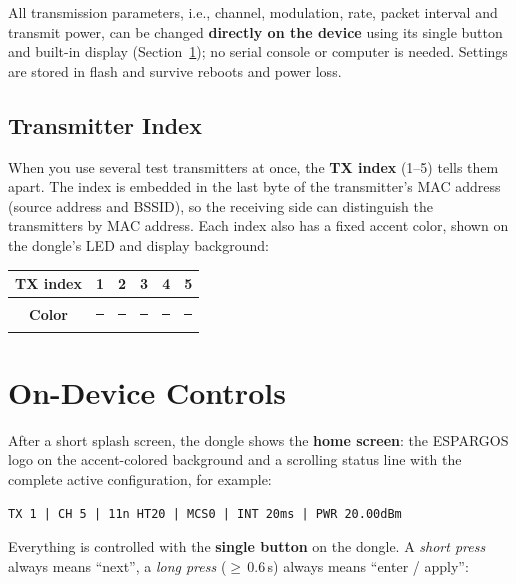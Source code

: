 \documentclass[a5paper, 10pt, twoside]{article}
\begin{document}
All transmission parameters, i.e., channel, modulation, rate, packet interval
and transmit power, can be changed \textbf{directly on the device} using its
single button and built-in display (Section~\ref{sec:controls}); no serial
console or computer is needed. Settings are stored in flash and survive
reboots and power loss.

\subsection{Transmitter Index}
When you use several test transmitters at once, the \textbf{TX index}
(1--5) tells them apart. The index is embedded in the last byte of the
transmitter's MAC address (source address and BSSID), so the receiving side
can distinguish the transmitters by MAC address. Each index also has a fixed
accent color, shown on the dongle's LED and display background:

\begin{center}
\begin{tabular}{@{}cccccc@{}}
\toprule
\textbf{TX index} & 1 & 2 & 3 & 4 & 5 \\
\midrule
\textbf{Color} &
\textcolor{txblue}{\rule{8mm}{3mm}} &
\textcolor{txorange}{\rule{8mm}{3mm}} &
\textcolor{txgreen}{\rule{8mm}{3mm}} &
\textcolor{txred}{\rule{8mm}{3mm}} &
\textcolor{txpurple}{\rule{8mm}{3mm}} \\
\bottomrule
\end{tabular}
\end{center}

\clearpage
\section{On-Device Controls}
\label{sec:controls}

After a short splash screen, the dongle shows the \textbf{home screen}: the
ESPARGOS logo on the accent-colored background and a scrolling status line
with the complete active configuration, for example:

\begin{center}
\texttt{\small TX 1 | CH 5 | 11n HT20 | MCS0 | INT 20ms | PWR 20.00dBm}
\end{center}

Everything is controlled with the \textbf{single button} on the dongle. A
\emph{short press} always means ``next'', a \emph{long press}
($\geq$\,0.6\,s) always means ``enter / apply'':
\end{document}

